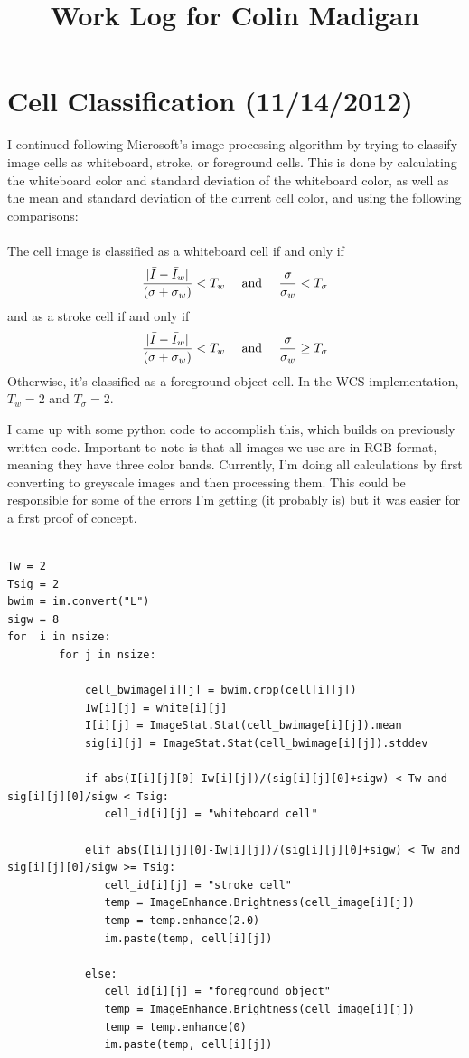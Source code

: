 \documentclass[]{article}
\begin{document}
\title{Work Log for Colin Madigan}
\date{}
\maketitle
	\tableofcontents

	\section{Cell Classification (11/14/2012)}
		I continued following Microsoft's image processing algorithm by trying to classify image cells as whiteboard, stroke, or foreground cells.  This is done by calculating the whiteboard color and standard deviation of the whiteboard color, as well as the mean and standard deviation of the current cell color, and using the following comparisons: \\ \\
	 The cell image is classified as a whiteboard cell if and only if \[ {|\bar{I} - \bar{I}_w| \over (\sigma + \sigma_w)}<T_w \quad \textrm{ and } \quad  {\sigma \over \sigma_w }< T_\sigma \] 
and as a stroke cell if and only if
\[{|\bar{I}-\bar{I}_w| \over (\sigma + \sigma_w)}<T_w \quad \textrm{ and } \quad {\sigma \over \sigma_w} \geq T_\sigma \] 
Otherwise, it's classified as a foreground object cell.  In the WCS implementation, $T_w=2$ and $T_\sigma=2$.	

I came up with some python code to accomplish this, which builds on previously written code.  Important to note is that all images we use are in RGB format, meaning they have three color bands.  Currently, I'm doing all calculations by first converting to greyscale images and then processing them.  This could be responsible for some of the errors I'm getting (it probably is) but it was easier for a first proof of concept.  

\begin{verbatim}

Tw = 2
Tsig = 2
bwim = im.convert("L")
sigw = 8
for  i in nsize:
        for j in nsize:
           
            cell_bwimage[i][j] = bwim.crop(cell[i][j])
            Iw[i][j] = white[i][j]            
            I[i][j] = ImageStat.Stat(cell_bwimage[i][j]).mean
            sig[i][j] = ImageStat.Stat(cell_bwimage[i][j]).stddev
          
            if abs(I[i][j][0]-Iw[i][j])/(sig[i][j][0]+sigw) < Tw and sig[i][j][0]/sigw < Tsig:
               cell_id[i][j] = "whiteboard cell"

            elif abs(I[i][j][0]-Iw[i][j])/(sig[i][j][0]+sigw) < Tw and sig[i][j][0]/sigw >= Tsig:
               cell_id[i][j] = "stroke cell"
               temp = ImageEnhance.Brightness(cell_image[i][j])
               temp = temp.enhance(2.0)
               im.paste(temp, cell[i][j])

            else:
               cell_id[i][j] = "foreground object"
               temp = ImageEnhance.Brightness(cell_image[i][j])
               temp = temp.enhance(0)
               im.paste(temp, cell[i][j])
\end{verbatim}
\end{document}
